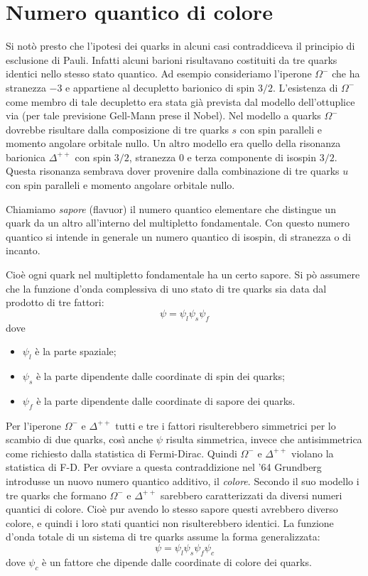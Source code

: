 \section{Numero quantico di colore}
Si notò presto che l'ipotesi dei quarks in alcuni casi contraddiceva il principio di esclusione di Pauli.
Infatti alcuni barioni risultavano costituiti da tre quarks identici nello stesso stato quantico. Ad esempio
consideriamo l'iperone $\Omega^-$ che ha stranezza $-3$ e appartiene al decupletto barionico di spin $3/2$.
L'esistenza di $\Omega^-$ come membro di tale decupletto era stata già prevista dal modello dell'ottuplice via (per
tale previsione Gell-Mann prese il Nobel).
Nel modello a quarks $\Omega^-$ dovrebbe risultare dalla composizione di tre quarks $s$ con spin paralleli e
momento angolare orbitale nullo.
Un altro modello era quello della risonanza barionica $\Delta^{++}$ con spin $3/2$, stranezza $0$ e terza
componente di isospin $3/2$.
Questa risonanza sembrava dover provenire dalla combinazione di tre quarks $u$ con spin paralleli e momento
angolare orbitale nullo.

Chiamiamo \textit{sapore} (flavuor) il numero quantico elementare che distingue un quark da un altro all'interno
del multipletto fondamentale.
Con questo numero quantico si intende in generale un numero quantico di isospin, di stranezza o di incanto.

Cioè ogni quark nel multipletto fondamentale ha un certo sapore. Si pò assumere che la funzione d'onda complessiva
di uno stato di tre quarks sia data dal prodotto di tre fattori:
\begin{equation}
\psi=\psi_l\psi_s\psi_f
\end{equation}
dove
\begin{itemize}
\item $\psi_l$ è la parte spaziale;
\item $\psi_s$ è la parte dipendente dalle coordinate di spin dei quarks;
\item $\psi_f$ è la parte dipendente dalle coordinate di sapore dei quarks.
\end{itemize}

Per l'iperone $\Omega^-$ e $\Delta^{++}$ tutti e tre i fattori risulterebbero simmetrici per lo scambio di due
quarks, così anche $\psi$ risulta simmetrica, invece che antisimmetrica come richiesto dalla statistica di
Fermi-Dirac.
Quindi $\Omega^-$ e $\Delta^{++}$ violano la statistica di F-D. Per ovviare a questa contraddizione nel
'64 Grundberg introdusse un nuovo numero quantico additivo, il \textit{colore}.
Secondo il suo modello i tre quarks che formano $\Omega^-$ e $\Delta^{++}$ sarebbero caratterizzati da diversi
numeri quantici di colore. Cioè pur avendo lo stesso sapore questi avrebbero diverso colore,
e quindi i loro stati quantici non risulterebbero identici.
La funzione d'onda totale di un sistema di tre quarks assume la forma generalizzata:
\begin{equation}
\psi=\psi_l\psi_s\psi_f\psi_c
\end{equation}
dove $\psi_c$ è un fattore che dipende dalle coordinate di colore dei quarks.

